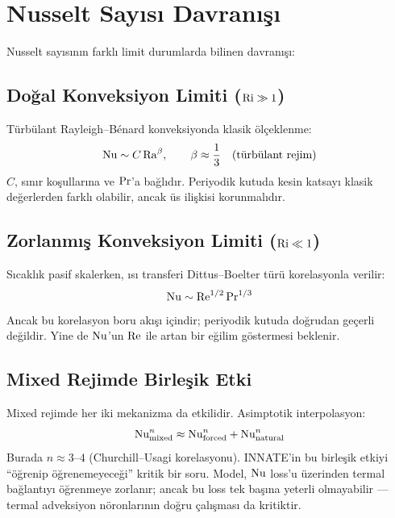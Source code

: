 \section{Nusselt Sayısı Davranışı}
\label{sec:nusselt_beklenen}

Nusselt sayısının farklı limit durumlarda bilinen davranışı:

\subsection{Doğal Konveksiyon Limiti ($\mathrm{Ri} \gg 1$)}

Türbülant Rayleigh--B\'{e}nard konveksiyonda klasik ölçeklenme:
\begin{equation}
    \mathrm{Nu} \sim C \, \mathrm{Ra}^{\beta}, \qquad \beta \approx \frac{1}{3} \quad \text{(türbülant rejim)}
    \label{eq:nu_ra_scaling}
\end{equation}
$C$, sınır koşullarına ve $\mathrm{Pr}$'a bağlıdır. Periyodik kutuda kesin katsayı klasik değerlerden farklı olabilir, ancak üs ilişkisi korunmalıdır.

\subsection{Zorlanmış Konveksiyon Limiti ($\mathrm{Ri} \ll 1$)}

Sıcaklık pasif skalerken, ısı transferi Dittus--Boelter türü korelasyonla verilir:
\begin{equation}
    \mathrm{Nu} \sim \mathrm{Re}^{1/2} \, \mathrm{Pr}^{1/3}
    \label{eq:nu_forced}
\end{equation}
Ancak bu korelasyon boru akışı içindir; periyodik kutuda doğrudan geçerli değildir. Yine de $\mathrm{Nu}$'un $\mathrm{Re}$ ile artan bir eğilim göstermesi beklenir.

\subsection{Mixed Rejimde Birleşik Etki}

Mixed rejimde her iki mekanizma da etkilidir. Asimptotik interpolasyon:
\begin{equation}
    \mathrm{Nu}_{\text{mixed}}^n \approx \mathrm{Nu}_{\text{forced}}^n + \mathrm{Nu}_{\text{natural}}^n
    \label{eq:nu_mixed}
\end{equation}
Burada $n \approx 3$--$4$ (Churchill--Usagi korelasyonu). INNATE'in bu birleşik etkiyi ``öğrenip öğrenemeyeceği'' kritik bir soru. Model, $\mathrm{Nu}$ loss'u üzerinden termal bağlantıyı öğrenmeye zorlanır; ancak bu loss tek başına yeterli olmayabilir --- termal adveksiyon nöronlarının doğru çalışması da kritiktir.


